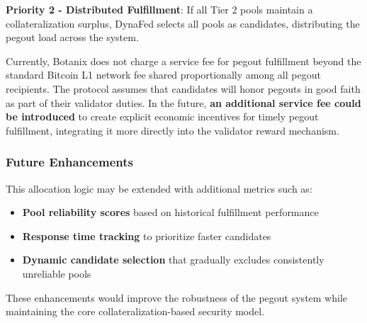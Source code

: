 \textbf{Priority 2 - Distributed Fulfillment}: If all Tier 2 pools maintain a collateralization surplus, DynaFed selects all pools as candidates, distributing the pegout load across the system.

Currently, Botanix does not charge a service fee for pegout fulfillment beyond the standard Bitcoin L1 network fee shared proportionally among all pegout recipients. The protocol assumes that candidates will honor pegouts in good faith as part of their validator duties. In the future, \textbf{an additional service fee could be introduced} to create explicit economic incentives for timely pegout fulfillment, integrating it more directly into the validator reward mechanism.

\subsubsection{Future Enhancements}

This allocation logic may be extended with additional metrics such as:
\begin{itemize}
    \item \textbf{Pool reliability scores} based on historical fulfillment performance
    \item \textbf{Response time tracking} to prioritize faster candidates
    \item \textbf{Dynamic candidate selection} that gradually excludes consistently unreliable pools
\end{itemize}

These enhancements would improve the robustness of the pegout system while maintaining the core collateralization-based security model.